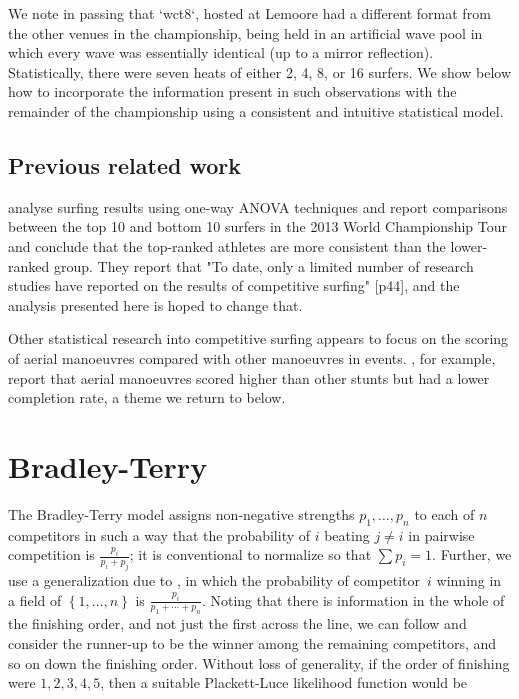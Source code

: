 \documentclass{article}
\begin{document}
We note in passing that `wct8`, hosted at Lemoore had a different
format from the other venues in the championship, being held in an
artificial wave pool in which every wave was essentially identical (up
to a mirror reflection).  Statistically, there were seven heats of
either 2, 4, 8, or 16 surfers.  We show below how to incorporate the
information present in such observations with the remainder of the
championship using a consistent and intuitive statistical model.

\subsection{Previous related work}

\cite{farley2013} analyse surfing results using one-way ANOVA techniques and
report comparisons between the top 10 and bottom 10 surfers in the
2013 World Championship Tour and conclude that the top-ranked athletes
are more consistent than the lower-ranked group. They report that "To
date, only a limited number of research studies have reported on the
results of competitive surfing" [p44], and the analysis presented here
is hoped to change that.

Other statistical research into competitive surfing appears to focus
on the scoring of aerial manoeuvres compared with other manoeuvres in
events.  \cite{undgren2014}, for example, report that aerial manoeuvres
scored higher than other stunts but had a lower completion rate, a
theme we return to below.

\section{Bradley-Terry}

The Bradley-Terry model \cite{bradley1954} assigns non-negative strengths
$p_1,\ldots, p_n$ to each of $n$ competitors in such a way that the
probability of $i$ beating $j\neq i$ in pairwise competition is
$\frac{p_i}{p_i+p_j}$; it is conventional to normalize so that $\sum
p_i=1$.  Further, we use a generalization due to \cite{luce1959}, in which
the probability of competitor~$i$ winning in a field of $\left\lbrace
1,\ldots, n\right\rbrace$ is $\frac{p_i}{p_1+\cdots +p_n}$.  Noting
that there is information in the whole of the finishing order, and not
just the first across the line, we can follow \cite{plackett1975} and
consider the runner-up to be the winner among the remaining
competitors, and so on down the finishing order. Without loss of
generality, if the order of finishing were $1,2,3,4,5$, then a
suitable Plackett-Luce likelihood function would be
\end{document}
